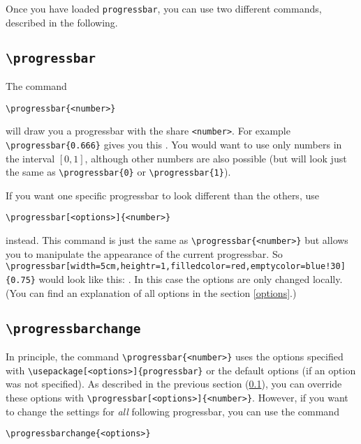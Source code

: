 \documentclass{ltxdoc}
\begin{document}
Once you have loaded \texttt{progressbar}, you can use two different commands, described in the following.
\subsection{\texttt{\textbackslash{}progressbar}}\label{commandprogressbar}
\DescribeMacro{\progressbar\{\}}
\DescribeMacro{\progressbar[]\{\}}
The command
\begin{lstlisting}
\progressbar{<number>}
\end{lstlisting}
will draw you a progressbar with the share \texttt{<number>}. For example \lstinline+\progressbar{0.666}+ gives you this . You would want to use only numbers in the interval $[0,1]$, although other numbers are also possible (but will look just the same as \lstinline+\progressbar{0}+ or \lstinline+\progressbar{1}+).

If you want one specific progressbar to look different than the others, use
\begin{lstlisting}
\progressbar[<options>]{<number>}
\end{lstlisting}
instead. This command is just the same as \lstinline+\progressbar{<number>}+ but allows you to manipulate the appearance of the current progressbar. So \lstinline+\progressbar[width=5cm,heightr=1,filledcolor=red,emptycolor=blue!30]{0.75}+ would look like this: . In this case the options are only changed locally. (You can find an explanation of all options in the section \ref{options}.)

\subsection{\texttt{\textbackslash{}progressbarchange}}
\DescribeMacro{\progressbarchange\{\}}
In principle, the command \lstinline+\progressbar{<number>}+ uses the options specified with \lstinline+\usepackage[<options>]{progressbar}+ or the default options (if an option was not specified). As described in the previous section (\ref{commandprogressbar}), you can override these options with \lstinline+\progressbar[<options>]{<number>}+. However, if you want to change the settings for \emph{all} following progressbar, you can use the command
\begin{lstlisting}
\progressbarchange{<options>}
\end{lstlisting}
\end{document}
